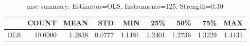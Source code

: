 \begin{table}[ht]
\centering
\caption{mse summary: Estimator=OLS, Instruments=125, Strength=0.30}
\begin{tabular}{lrrrrrrrr}
\toprule
 & COUNT & MEAN & STD & MIN & 25\% & 50\% & 75\% & MAX \\
\midrule
OLS & 10.0000 & 1.2838 & 0.0777 & 1.1481 & 1.2401 & 1.2736 & 1.3229 & 1.4131 \\
\bottomrule
\end{tabular}
\end{table}
